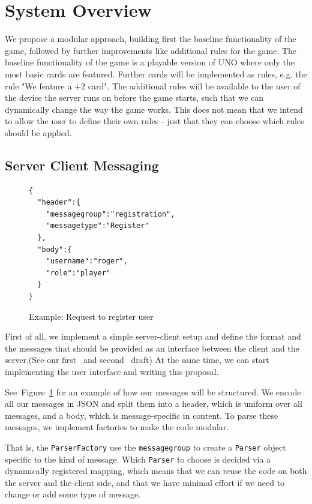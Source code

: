 \documentclass{sig-alternate}
\newcommand{\lfig}[1]{\label{fig:#1}}
\newcommand{\rfig}[1]{Figure~\ref{fig:#1}}
\begin{document}
\section{System Overview}
We propose a modular approach, building first the baseline functionality of the game, followed by further improvements like additional rules for the game. The baseline functionality of the game is a playable version of UNO where only the most basic cards are featured. Further cards will be implemented as rules, e.g. the rule "We feature a +2 card". The additional rules will be available to the user of the device the server runs on before the game starts, such that we can dynamically change the way the game works. This does not mean that we intend to allow the user to define their own rules - just that they can choose which rules should be applied.

\subsection{Server Client Messaging}
\begin{figure}[!htbp]
\begin{verbatim}
{
  "header":{
    "messagegroup":"registration",
    "messagetype":"Register"
  },
  "body":{
    "username":"roger",
    "role":"player"
  }
}
\end{verbatim}
\caption{Example: Request to register user}
\lfig{regmsg}
\end{figure}

First of all, we implement a simple server-client setup and define the format and the messages that should be provided as an interface between the client and the server.(See our first~\cite{messaging} and second~\cite{messaging2} draft) At the same time, we can start implementing the user interface and writing this proposal.

See~\rfig{regmsg} for an example of how our messages will be structured. We encode all our messages in JSON and split them into a header, which is uniform over all messages, and a body, which is message-specific in content. To parse these messages, we implement factories to make the code modular.

That is, the \verb|ParserFactory| use the \verb|messagegroup| to create a \verb|Parser| object specific to the kind of message. Which \verb|Parser| to choose is decided via a dynamically registered mapping, which means that we can reuse the code on both the server and the client side, and that we have minimal effort if we need to change or add some type of message.
\end{document}
